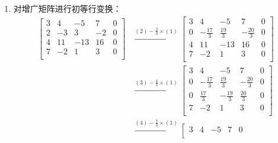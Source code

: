 \begin{problem}
\begin{solution}
\begin{enumerate}
$$\begin{aligned}
\begin{array}{ccccc|c}
					0 & 0 & 3 & -2 & -1 & 2 \\
					0 & 0 & 0 & 1 & 1/2 & -1 \\
					0 & 0 & 0 & 0 & 0 & 0 \\
				\end{array}\right]
			\end{aligned}
			$$
			也就是说，方程组有无穷多组解，以 $x_5$ 为自由元就有：
			$$
			\begin{cases}
				x_1 = -\frac{x_5}{2} \\
				x_2 = -1 - \frac{x_5}{2} \\
				x_3 = 0 \\
				x_4 = -1 - \frac{x_5}{2} \\
			\end{cases}
			$$

			\item[\textbf{4)}] 对增广矩阵进行初等行变换：
			$$
			\begin{aligned}
				\left[\begin{array}{cccc|c}
					3 & 4 & -5 & 7 & 0 \\
					2 & -3 & 3 & -2 & 0 \\
					4 & 11 & -13 & 16 & 0 \\
					7 & -2 & 1 & 3 & 0 \\
				\end{array}\right]
				& \xrightarrow{(2) - \frac{2}{3} \times (1)} \left[\begin{array}{cccc|c}
					3 & 4 & -5 & 7 & 0 \\
					0 & -\frac{17}{3} & \frac{19}{3} & -\frac{20}{3} & 0 \\
					4 & 11 & -13 & 16 & 0 \\
					7 & -2 & 1 & 3 & 0 \\
				\end{array}\right] \\
				& \xrightarrow{(3) - \frac{4}{3} \times (1)} \left[\begin{array}{cccc|c}
					3 & 4 & -5 & 7 & 0 \\
					0 & -\frac{17}{3} & \frac{19}{3} & -\frac{20}{3} & 0 \\
					0 & \frac{17}{3} & -\frac{19}{3} & \frac{20}{3} & 0 \\
					7 & -2 & 1 & 3 & 0 \\
				\end{array}\right] \\
				& \xrightarrow{(4) - \frac{7}{3} \times (1)} \left[\begin{array}{cccc|c}
					3 & 4 & -5 & 7 & 0 \\

\end{array}
\end{aligned}$$
\end{enumerate}
\end{solution}
\end{problem}
